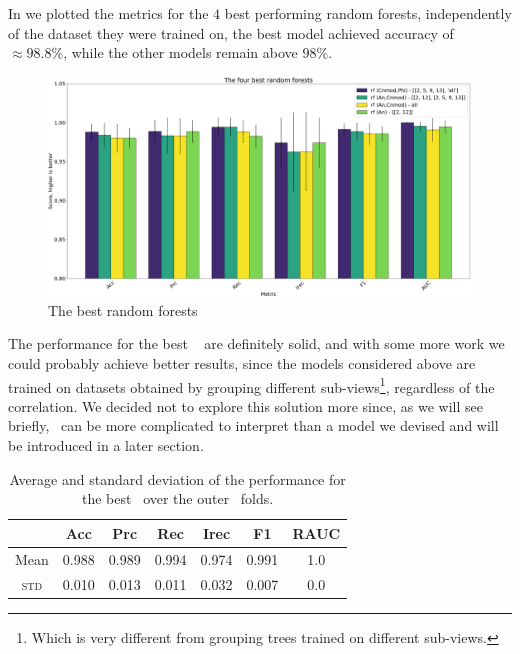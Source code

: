 In  we plotted the metrics for the $4$ best performing random forests,
independently of the dataset they were trained on, the best model achieved accuracy of $\approx 98.8\%$, while the other models remain above $98\%$.
\begin{figure}
	\centering
	\includegraphics[width=\linewidth]{img/best_rfs.png}
	\caption{The best random forests} \label{fig:best-rfs}
\end{figure}
The performance for the best \rf\  are definitely solid, and with some more work we could probably achieve better
results, since the models considered above are trained on datasets obtained by grouping
different sub-views\footnote{Which is very different from grouping trees trained on different
	sub-views.}, regardless of the correlation. We decided not to explore this solution more
since, as we will see briefly, \rfs\ can be more complicated to interpret than a model
we devised and will be introduced in a later section.
\begin{table}[t]
	\caption{Average and standard deviation of the performance for the best \rf\ over the outer \cv\
		folds.}\label{tbl:}

	\bigskip
	\setlength{\tabcolsep}{6pt}
	\centering
	\begin{tabular}{ccccccc}
		\toprule
		\textbf{}    & \textbf{Acc} & \textbf{Prc} & \textbf{Rec} & \textbf{Irec} & \textbf{F1} & \textbf{RAUC} \\
		\midrule
		Mean         & 0.988        & 0.989        & 0.994        & 0.974         & 0.991
		             & 1.0                                                                                      \\
		\textsc{std} & 0.010        & 0.013        & 0.011        & 0.032         & 0.007
		             & 0.0                                                                                      \\
		\bottomrule
	\end{tabular}
\end{table}
